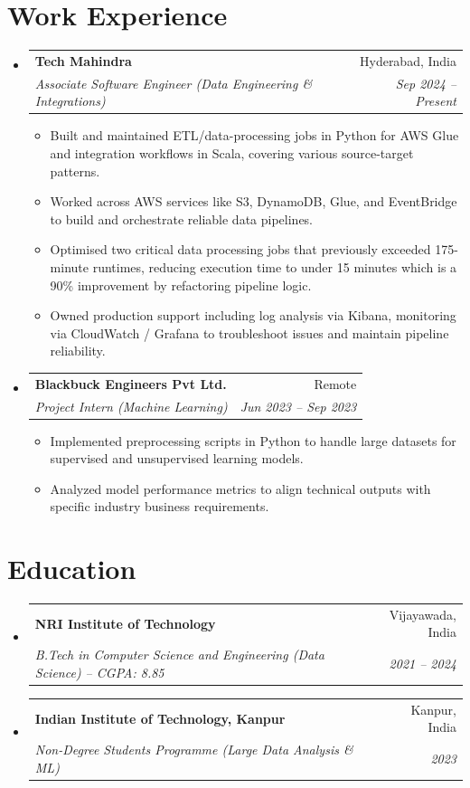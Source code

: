 \documentclass[a4paper,10pt]{article}
\makeatletter
\newcommand{\resumeItem}[1]{\item\small{#1 \vspace{-1pt}}}
\newcommand{\resumeSubheading}[4]{
  \vspace{-1pt}\item
    \begin{tabular*}{0.97\textwidth}[t]{l@{\extracolsep{\fill}}r}
      \textbf{#1} & #2 \\
      \textit{#3} & \textit{#4} \\
    \end{tabular*}\vspace{-6pt}
}
\makeatother
\begin{document}
\section{Work Experience}
\begin{itemize}[leftmargin=*]
    \resumeSubheading{Tech Mahindra}{Hyderabad, India}{Associate Software Engineer (Data Engineering \& Integrations)}{Sep 2024 -- Present}
    \begin{itemize}[leftmargin=1.5em]
        \resumeItem{Built and maintained ETL/data-processing jobs in Python for AWS Glue and integration workflows in Scala, covering various
        source-target patterns.}
        \resumeItem {Worked across AWS services like S3, DynamoDB, Glue, and EventBridge to build and orchestrate reliable data pipelines.}
        \resumeItem{Optimised two critical data processing jobs that previously exceeded 175-minute runtimes, reducing execution time to under 15 minutes which is a 90\% improvement by refactoring pipeline logic.}
        \resumeItem{Owned production support including log analysis via Kibana, monitoring via CloudWatch / Grafana to troubleshoot issues and maintain pipeline reliability.}
    \end{itemize}

    \resumeSubheading{Blackbuck Engineers Pvt Ltd.}{Remote}{Project Intern (Machine Learning)}{Jun 2023 -- Sep 2023}
    \begin{itemize}[leftmargin=1.5em]
        \resumeItem{Implemented preprocessing scripts in Python to handle large datasets for supervised and unsupervised learning models.}
        \resumeItem{Analyzed model performance metrics to align technical outputs with specific industry business requirements.}
    \end{itemize}
\end{itemize}

\section{Education}
\begin{itemize}[leftmargin=*]
    \resumeSubheading{NRI Institute of Technology}{Vijayawada, India}{B.Tech in Computer Science and Engineering (Data Science) -- CGPA: 8.85}{2021 -- 2024}
    \resumeSubheading{Indian Institute of Technology, Kanpur}{Kanpur, India}{Non-Degree Students Programme (Large Data Analysis \& ML)}{2023}
\end{itemize}
\end{document}
